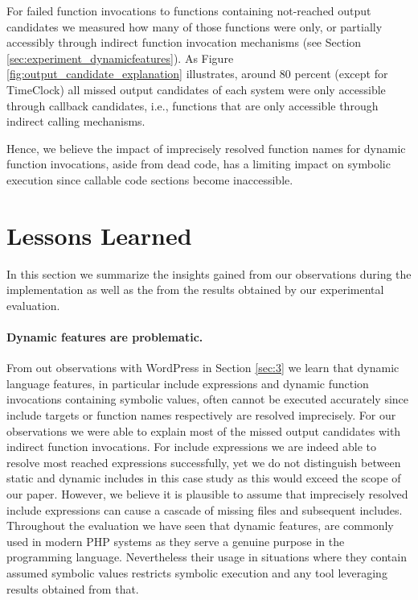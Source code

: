 \documentclass[sigconf, preprint]{acmart}
\renewcommand{\sf}[1]{\textsf{#1}}
\begin{document}
For failed function invocations to functions containing not-reached output
candidates we measured how many of those functions were only, or
partially accessibly through indirect function invocation mechanisms (see
Section \ref{sec:experiment_dynamicfeatures}). As Figure
\ref{fig:output_candidate_explanation} illustrates, around 80 percent (except
for \sf{TimeClock}) all missed output candidates of each system were only
accessible through callback candidates, i.e., functions that are only
accessible through indirect calling mechanisms.

Hence, we believe the impact of imprecisely resolved function names for dynamic
function invocations, aside from dead code, has a limiting impact on symbolic
execution since callable code sections become inaccessible.

\section{Lessons Learned}
In this section we summarize the insights gained from our observations during
the implementation as well as the from the results obtained by our experimental
evaluation.

\paragraph{Dynamic features are problematic.}
From out observations with \sf{WordPress} in Section \ref{sec:3} we learn that
dynamic language features, in particular include expressions and dynamic
function invocations containing symbolic values, often cannot be executed
accurately since include targets or function names respectively are resolved
imprecisely.
For our observations we were able to explain most of the missed
output candidates with indirect function invocations. For include expressions we
are indeed able to resolve most reached expressions successfully, yet we do not
distinguish between static and dynamic includes in this case study as this 
would exceed the scope of our paper. However, we believe it is plausible to
assume that imprecisely resolved include expressions can cause a cascade of
missing files and subsequent includes.
Throughout the evaluation we have seen that dynamic features, are commonly used
in modern PHP systems as they serve a genuine purpose in the programming
language.
Nevertheless their usage in situations where they contain assumed symbolic
values restricts symbolic execution and any tool leveraging results obtained
from that.
\end{document}
